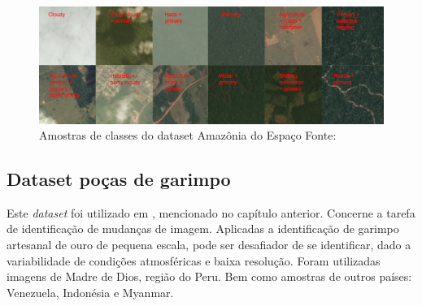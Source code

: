 \begin{figure}[!ht]
    \centering
    \includegraphics[width=0.9\columnwidth]{
        Imagens/chips.jpg
    }
    \caption{Amostras de classes do dataset Amazônia do Espaço Fonte:\cite{Kaggle:PlanetAmazonFromSpace}}\label{fig:dataset}
\end{figure}



\subsection{Dataset poças de garimpo}\label{sec:Cap2_amazonia_garimpo}

Este \textit{dataset} foi utilizado em \cite{rs14071746}, mencionado no capítulo anterior. Concerne a tarefa de identificação de mudanças de imagem. Aplicadas a identificação de garimpo artesanal de ouro de pequena escala, pode ser desafiador de se identificar, dado a variabilidade de condições atmosféricas e baixa resolução. Foram utilizadas imagens de Madre de Dios, região do Peru. Bem como amostras de outros países: Venezuela, Indonésia e Myanmar. 

